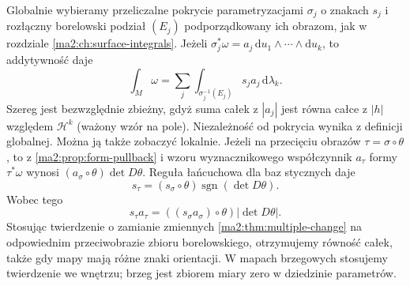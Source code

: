 Globalnie wybieramy przeliczalne pokrycie
parametryzacjami $\sigma_j$ o znakach $s_j$ i rozłączny
borelowski podział $(E_j)$ podporządkowany
ich obrazom, jak w rozdziale
\ref{ma2:ch:surface-integrals}.
Jeżeli $\sigma_j^*\omega=a_j\,\mathrm du_1\wedge
\cdots\wedge\mathrm du_k$, to addytywność daje
\[
 \int_M\omega=\sum_j\int_{\sigma_j^{-1}(E_j)}
 s_j a_j\,\mathrm d\lambda_k.
\]
Szereg jest bezwzględnie zbieżny, gdyż suma
całek z $|a_j|$ jest równa całce z $|h|$
względem $\mathcal H^k$ (ważony wzór na pole).
Niezależność od pokrycia wynika z definicji
globalnej. Można ją także zobaczyć lokalnie.
Jeżeli na przecięciu obrazów $\tau=\sigma\circ\theta$,
to z \ref{ma2:prop:form-pullback} i wzoru
wyznacznikowego współczynnik $a_\tau$ formy
$\tau^*\omega$ wynosi $(a_\sigma\circ\theta)\det D\theta$.
Reguła łańcuchowa dla baz stycznych daje
\[
 s_\tau=(s_\sigma\circ\theta)\operatorname{sgn}(\det D\theta).
\]
Wobec tego
\[
 s_\tau a_\tau=
 ((s_\sigma a_\sigma)\circ\theta)|\det D\theta|.
\]
Stosując twierdzenie o zamianie zmiennych
\ref{ma2:thm:multiple-change} na odpowiednim
przeciwobrazie zbioru borelowskiego, otrzymujemy
równość całek, także gdy mapy mają różne znaki
orientacji. W mapach brzegowych stosujemy
twierdzenie we wnętrzu; brzeg jest zbiorem
miary zero w dziedzinie parametrów.

